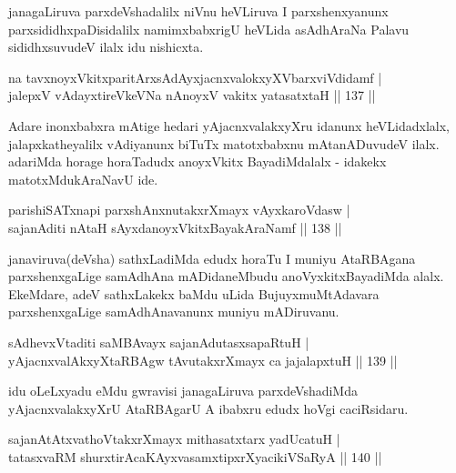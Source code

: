 \begin{artha}
janagaLiruva parxdeVshadalilx niVnu heVLiruva I parxshenxyanunx parxsididhxpaDisidalilx namimxbabxrigU heVLida asAdhAraNa Palavu sididhxsuvudeV ilalx idu nishicxta.
\end{artha}

\begin{shl}
na tavxnoyxVkitxparitArxsAdAyxjacnxvalokxyXV\s barxviVdidamf |\\
jalepxV vAdayxtireVkeVNa nAnoyxV vakitx yatasatxtaH \hfill || 137 ||
\end{shl}

\begin{artha}
Adare inonxbabxra mAtige hedari yAjacnxvalakxyXru idanunx heVLidadxlalx, jalapxkatheyalilx vAdiyanunx biTuTx matotxbabxnu mAtanADuvudeV ilalx. adariMda horage horaTadudx anoyxVkitx BayadiMdalalx - idakekx matotxMdukAraNavU ide.
\end{artha}

\begin{shl}
parishiSATxnapi parxshAnxnutakxrXmayx vAyxkaroVdasw |\\
sajanAditi nAtaH sAyxdanoyxVkitxBayakAraNamf \hfill || 138 ||
\end{shl}

\begin{artha}
janaviruva(deVsha) sathxLadiMda edudx horaTu I muniyu AtaRBAgana parxshenxgaLige samAdhAna mADidaneMbudu anoVyxkitxBayadiMda alalx. EkeMdare, adeV sathxLakekx baMdu uLida BujuyxmuMtAdavara parxshenxgaLige samAdhAnavanunx muniyu mADiruvanu.
\end{artha}


\begin{shl}
sAdhevxVtaditi saMBAvayx sajanAdutasxsapaRtuH |\\
yAjacnxvalAkxyXtaRBAgw tAvutakxrXmayx ca jajalapxtuH \hfill || 139 ||
\end{shl}

\begin{artha}
idu oLeLxyadu eMdu gwravisi janagaLiruva parxdeVshadiMda yAjacnxvalakxyXrU AtaRBAgarU A ibabxru edudx hoVgi caciRsidaru.
\end{artha}


\begin{shl}
sajanAtAtxvathoVtakxrXmayx mithasatxtarx yadUcatuH |\\
tatasxvaRM shurxtirAcaKAyxvasamxtipxrXyacikiVSaRyA \hfill || 140 ||
\end{shl}

